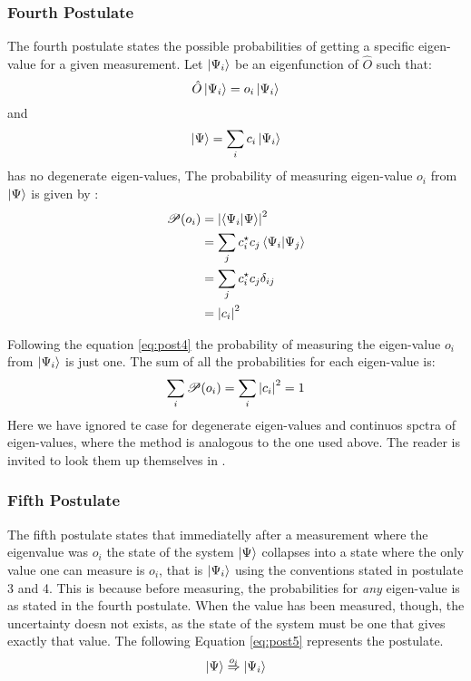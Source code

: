 \documentclass[../master_thesis.tex]{subfiles}
\begin{document}
\subsubsection{Fourth Postulate}
The fourth postulate states the possible probabilities of getting a specific
eigen-value for a given measurement.
Let $\ket{\Psi_i}$ be an eigenfunction of $\hat{O}$ such that:
\begin{equation}
  \hat{O}\ket{\Psi_i} = o_i\ket{\Psi_i}
\end{equation}
and
\begin{equation}
  \ket{\Psi} = \sum_i c_i \ket{\Psi_i}
\end{equation}
has no degenerate eigen-values,
The probability of measuring eigen-value $o_i$ from $\ket{\Psi}$ is given by
\cite{Cohen:1973}:
\begin{align} \label{eq:post4}
  \begin{split}
    \mathscr{P}(o_i) &= \abs{\braket{\Psi_i|\Psi}}^2\\
                     &= \sum_{j}c_i^\star c_j\braket{\Psi_i|\Psi_j}\\
                     &= \sum_{j}c_i^\star c_j\delta_{ij}\\
                     &= \abs{c_i}^2
  \end{split}
\end{align}

Following the equation \ref{eq:post4} the probability of measuring the
eigen-value $o_i$ from $\ket{\Psi_i}$ is just one. The sum of all the probabilities
for each eigen-value is:
\begin{equation}
  \sum_i\mathscr{P}(o_i) = \sum_i \abs{c_i}^2 = 1
\end{equation}
Here we have ignored te case for degenerate eigen-values and continuos spctra of
eigen-values, where the method is analogous to the one used above. The reader is
invited to look them up themselves in \cite{Cohen:1973, Atkins:2011}.

\subsubsection{Fifth Postulate}
The fifth postulate states that immediatelly after a measurement where the eigenvalue was $o_i$
the state of the system $\ket{\Psi}$ collapses into a state where the only value one
can measure is $o_i$, that is $ \ket{\Psi_i} $ using the conventions stated in postulate 3 and 4.
This is because before measuring, the probabilities for \textit{any} eigen-value
is as stated in the fourth postulate. When the value has been measured, though,
the uncertainty doesn not exists, as the state of the system must be one that gives
exactly that value. The following Equation \ref{eq:post5} represents the postulate.
\begin{equation}\label{eq:post5}
  \ket{\Psi} \stackrel{o_i}{\Rightarrow} \ket{\Psi_i}
\end{equation}
\end{document}

